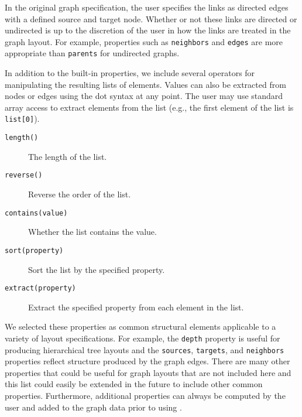 
In the original graph specification, the user specifies the links as directed
edges with a defined source and target node. Whether or not these links are
directed or undirected is up to the discretion of the user in how the links
are treated in the graph layout. For example, properties such as
\texttt{neighbors} and \texttt{edges} are more appropriate than \texttt{parents}
for undirected graphs.

In addition to the built-in properties, we include several operators for 
manipulating the resulting lists of elements. Values can also be extracted from
nodes or edges using the dot syntax at any point. The user may use standard
array access to extract elements from the list (e.g., the first element of
the list is \texttt{list[0]}).

\begin{description}
\item[\texttt{length()}] The length of the list.
\item[\texttt{reverse()}] Reverse the order of the list.
\item[\texttt{contains(value)}] Whether the list contains the value.
\item[\texttt{sort(property)}] Sort the list by the specified property.
\item[\texttt{extract(property)}] Extract the specified property from each element in the list.
\end{description}



We selected these properties as common structural elements
applicable to a variety of layout specifications. For example, the \texttt{depth}
property is useful for producing hierarchical tree layouts and the 
\texttt{sources}, \texttt{targets}, and \texttt{neighbors} properties
reflect structure produced by the graph edges. There are many other
properties that could be useful for graph layouts that are not included 
here and this list could easily be extended in the future to include other
common properties. Furthermore, additional properties can always be
computed by the user and added to the graph data prior to using \projectname.

